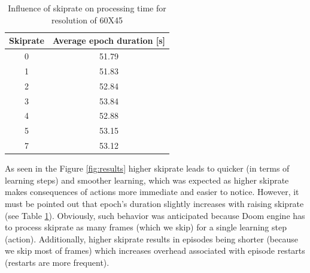 \documentclass[english,bachelor,a4paper,twoside]{ppfcmthesis}
\begin{document}
			\begin{table}
				\begin{center}
					\begin{tabular}{ |c | c |}
						\hline
						Skiprate & Average epoch duration [s] \\ \hline
						0 & 51.79 \\ \hline
						1 & 51.83 \\ \hline
						2 & 52.84 \\ \hline
						3 & 53.84 \\ \hline
						4 & 52.88 \\ \hline
						5 & 53.15 \\ \hline
						7 & 53.12 \\ \hline
					\end{tabular}
				\end{center}
				\caption{Influence of skiprate on processing time for resolution of 60X45}\label{tab:time_results}
			\end{table}
			As seen in the Figure \ref{fig:results} higher skiprate leads to quicker (in terms of learning steps) and smoother learning, which was expected as higher skiprate makes consequences of actions more immediate and easier to notice. However, it must be pointed out that epoch's duration slightly increases with raising skiprate (see Table \ref{tab:time_results}). Obviously, such behavior was anticipated because Doom engine has to process skiprate as many frames (which we skip) for a single learning step (action). Additionally, higher skiprate results in episodes being shorter (because we skip most of frames) which increases overhead associated with episode restarts (restarts are more frequent). 
\end{document}

